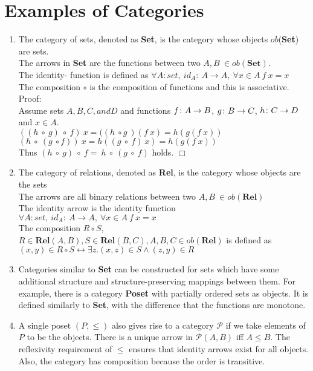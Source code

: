 \section {Examples of Categories}
\begin {enumerate}

 \item The category of sets, denoted as \textbf{Set}, is the category whose objects $ob$(\textbf{Set}) are sets.
   \\ The arrows in \textbf{Set} are the functions between two $A,B\ \in ob(\textbf{Set}).$
   \\ The identity- function is defined as $\forall A: set, \ id_A:\ A \to A,\ \forall x \in A \ f \ x = x$
   \\ The composition $\circ$ is the composition of functions and this is associative. Proof:
   \\ Assume sets $A, B, C, and D$ and functions $f \from A \to B$, $g \from B \to C$, $h \from C \to D$ and $x \in A$.
   \\ $((h\ \circ \ g)\ \circ\ f)\ x = ((h \ \circ g \ )(f \ x) =h(g(f\  x)) $
   \\ $(h\ \circ \ (g \ \circ f))\ x = h ((g\ \circ \ f) \ x) = h(g(f \ x))$
   \\ Thus $(h\ \circ \ g)\ \circ \ f = \ h \ \circ \ (g \ \circ \ f)$ holds. $\Box$
 \item The category of relations, denoted as \textbf{Rel}, is the category whose objects are the sets
   \\The arrows are all binary relations between two $A,B \ \in ob(\textbf{Rel})$
   \\The identity arrow  is the identity function $\forall A: set, \ id_A:\ A \to A,\ \forall x \in A \ f \ x = x$
   \\ The composition $R \circ S$, $R  \in \textbf{Rel}(A,B), S \in \textbf{Rel}(B,C), A,B,C \in ob(\textbf{Rel})$ is defined as $ (x,y) \in  R \circ S \leftrightarrow \exists  z.(x,z) \in S \land (z,y) \in R$
   
  \item Categories similar to \textbf{Set} can be constructed for sets which have some additional structure and structure-preserving mappings between them. For example, there is a category \textbf{Poset} with partially ordered sets as objects. It is defined similarly to \textbf{Set}, with the difference that the functions are monotone. 
  
  \item A single poset $(P, \leq)$ also gives rise to a category $\mathscr{P}$ if we take elements of $P$ to be the objects. There is a unique arrow in $\mathscr{P}(A, B)$ iff $A \leq B$. The reflexivity requirement of $\leq$ ensures that identity arrows exist for all objects. Also, the category has composition because the order is transitive.
  

\end{enumerate}
